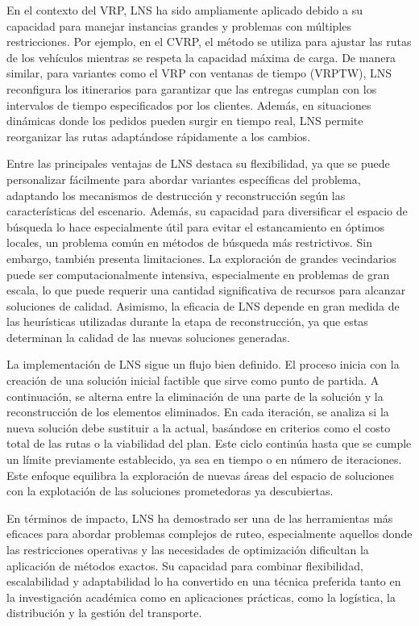 \documentclass{article}
\begin{document}
En el contexto del VRP, LNS ha sido ampliamente aplicado debido a su capacidad para manejar instancias grandes y problemas con múltiples restricciones. Por ejemplo, en el CVRP, el método se utiliza para ajustar las rutas de los vehículos mientras se respeta la capacidad máxima de carga. De manera similar, para variantes como el VRP con ventanas de tiempo (VRPTW), LNS reconfigura los itinerarios para garantizar que las entregas cumplan con los intervalos de tiempo especificados por los clientes. Además, en situaciones dinámicas donde los pedidos pueden surgir en tiempo real, LNS permite reorganizar las rutas adaptándose rápidamente a los cambios.

Entre las principales ventajas de LNS destaca su flexibilidad, ya que se puede personalizar fácilmente para abordar variantes específicas del problema, adaptando los mecanismos de destrucción y reconstrucción según las características del escenario. Además, su capacidad para diversificar el espacio de búsqueda lo hace especialmente útil para evitar el estancamiento en óptimos locales, un problema común en métodos de búsqueda más restrictivos. Sin embargo, también presenta limitaciones. La exploración de grandes vecindarios puede ser computacionalmente intensiva, especialmente en problemas de gran escala, lo que puede requerir una cantidad significativa de recursos para alcanzar soluciones de calidad. Asimismo, la eficacia de LNS depende en gran medida de las heurísticas utilizadas durante la etapa de reconstrucción, ya que estas determinan la calidad de las nuevas soluciones generadas.\cite{ref4}

La implementación de LNS sigue un flujo bien definido. El proceso inicia con la creación de una solución inicial factible que sirve como punto de partida. A continuación, se alterna entre la eliminación de una parte de la solución y la reconstrucción de los elementos eliminados. En cada iteración, se analiza si la nueva solución debe sustituir a la actual, basándose en criterios como el costo total de las rutas o la viabilidad del plan. Este ciclo continúa hasta que se cumple un límite previamente establecido, ya sea en tiempo o en número de iteraciones. Este enfoque equilibra la exploración de nuevas áreas del espacio de soluciones con la explotación de las soluciones prometedoras ya descubiertas.

En términos de impacto, LNS ha demostrado ser una de las herramientas más eficaces para abordar problemas complejos de ruteo, especialmente aquellos donde las restricciones operativas y las necesidades de optimización dificultan la aplicación de métodos exactos. Su capacidad para combinar flexibilidad, escalabilidad y adaptabilidad lo ha convertido en una técnica preferida tanto en la investigación académica como en aplicaciones prácticas, como la logística, la distribución y la gestión del transporte.
\end{document}
